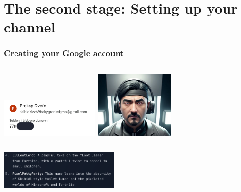 \documentclass{beamer}
\begin{document}
\section{The second stage: Setting up your channel}
\begin{frame}
	\frametitle{Creating your Google account}

	\begin{columns}
		\includegraphics[width=5cm,center]{google-account-setup/account-info.png}
		\includegraphics[width=4cm,center]{google-account-setup/profile-picture.png}
	\end{columns}

	\vskip 0.6cm

	\includegraphics[width=6cm,center]{google-account-setup/usernames.png}
\end{frame}
\end{document}
